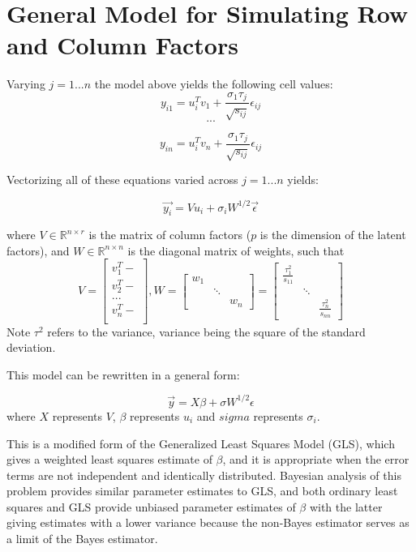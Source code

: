 \documentclass[12pt,twoside]{dukestatscithesis}
\theoremstyle{definition}
\theoremstyle{definition}
\theoremstyle{definition}
\theoremstyle{remark}
\begin{document}
\section{General Model for Simulating Row and Column
Factors}\label{general-model-for-simulating-row-and-column-factors}

Varying \(j = 1 ... n\) the model above yields the following cell
values:
\[y_{i1} = u_i^Tv_1 + \frac{\sigma_1 \tau_j}{\sqrt{s_{ij}}}\epsilon_{ij}\]
\[ ... \]

\[ y_{in} = u_i^Tv_n + \frac{\sigma_1 \tau_j}{\sqrt{s_{ij}}}\epsilon_{ij} \]

Vectorizing all of these equations varied across \(j = 1...n\) yields:

\[\vec{y_i} = Vu_i + \sigma_i W^{1/2}\vec{\epsilon}\]

where \(V \in \mathbb{R}^{n \times r}\) is the matrix of column factors
(\(p\) is the dimension of the latent factors), and
\(W \in \mathbb{R}^{n \times n}\) is the diagonal matrix of weights,
such that \[V =
  \begin{bmatrix}
    v_1^T- \\
    v_2^T- \\
    ... \\
    v_n^T- \\
  \end{bmatrix},
  W =
  \begin{bmatrix}
    w_{1} & & \\
    & \ddots & \\
    & & w_{n}
  \end{bmatrix} 
  = \begin{bmatrix}
    \frac{\tau_1^2}{s_{11}} & & \\
    & \ddots & \\
    & & \frac{\tau_n^2}{s_{nn}}
  \end{bmatrix}\]
Note \(\tau^2\) refers to the variance, variance being the square of the
standard deviation.

This model can be rewritten in a general form:

\[\vec{y} = X\beta + \sigma W^{1/2}\epsilon\] where \(X\) represents
\(V\), \(\beta\) represents \(u_i\) and \(sigma\) represents
\(\sigma_i\).

This is a modified form of the Generalized Least Squares Model (GLS),
which gives a weighted least squares estimate of \(\beta\), and it is
appropriate when the error terms are not independent and identically
distributed. Bayesian analysis of this problem provides similar
parameter estimates to GLS, and both ordinary least squares and GLS
provide unbiased parameter estimates of \(\beta\) with the latter giving
estimates with a lower variance because the non-Bayes estimator serves
as a limit of the Bayes estimator.
\end{document}
